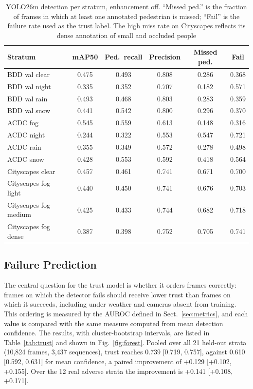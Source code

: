 \documentclass[pdflatex,sn-mathphys-num]{sn-jnl}
\begin{document}
\begin{table}[t]
\caption{YOLO26m detection per stratum, enhancement off. ``Missed ped.'' is the fraction of frames in which at least one annotated pedestrian is missed; ``Fail'' is the failure rate used as the trust label. The high miss rate on Cityscapes reflects its dense annotation of small and occluded people}
\label{tab:detection}
\begin{tabular}{@{}lccccc@{}}
\toprule
Stratum & mAP50 & Ped.\ recall & Precision & Missed ped. & Fail \\
\midrule
BDD val clear & 0.475 & 0.493 & 0.808 & 0.286 & 0.368 \\
BDD val night & 0.335 & 0.352 & 0.707 & 0.182 & 0.571 \\
BDD val rain & 0.493 & 0.468 & 0.803 & 0.283 & 0.359 \\
BDD val snow & 0.441 & 0.542 & 0.800 & 0.296 & 0.370 \\
ACDC fog & 0.545 & 0.559 & 0.613 & 0.148 & 0.316 \\
ACDC night & 0.244 & 0.322 & 0.553 & 0.547 & 0.721 \\
ACDC rain & 0.355 & 0.349 & 0.572 & 0.278 & 0.498 \\
ACDC snow & 0.428 & 0.553 & 0.592 & 0.418 & 0.564 \\
Cityscapes clear & 0.457 & 0.461 & 0.741 & 0.671 & 0.700 \\
Cityscapes fog light & 0.440 & 0.450 & 0.741 & 0.676 & 0.703 \\
Cityscapes fog medium & 0.425 & 0.433 & 0.744 & 0.682 & 0.718 \\
Cityscapes fog dense & 0.387 & 0.398 & 0.752 & 0.705 & 0.741 \\
\bottomrule
\end{tabular}
\end{table}

\subsection{Failure Prediction}\label{sec:res_trust}

The central question for the trust model is whether it orders frames correctly: frames on which the detector fails should receive lower trust than frames on which it succeeds, including under weather and cameras absent from training. This ordering is measured by the AUROC defined in Sect.~\ref{sec:metrics}, and each value is compared with the same measure computed from mean detection confidence. The results, with cluster-bootstrap intervals, are listed in Table~\ref{tab:trust} and shown in Fig.~\ref{fig:forest}. Pooled over all 21 held-out strata (10,824 frames, 3,437 sequences), trust reaches 0.739 [0.719, 0.757], against 0.610 [0.592, 0.631] for mean confidence, a paired improvement of +0.129 [+0.102, +0.155]. Over the 12 real adverse strata the improvement is +0.141 [+0.108, +0.171].
\end{document}
